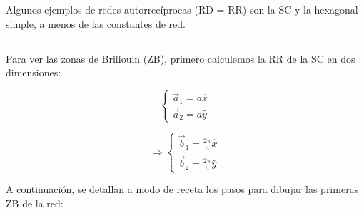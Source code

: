 \documentclass[a4paper]{article}
\begin{document}
Algunos ejemplos de redes autorrec\'iprocas (RD = RR) son la SC y la hexagonal simple, a menos de las constantes de red.

\subsection{}

Para ver las zonas de Brillouin (ZB), primero calculemos la RR de la SC en dos dimensiones:

$$\begin{cases}
\vec{a}_{1} = a\hat{x} \\
\vec{a}_{2} = a\hat{y}
\end{cases}$$

$$\Rightarrow \begin{cases}
\vec{b}_{1} = \frac{2 \pi}{a}\hat{x} \\
\vec{b}_{2} = \frac{2 \pi}{a}\hat{y}
\end{cases}$$

A continuaci\'on, se detallan a modo de receta los pasos para dibujar las primeras ZB de la red:
\end{document}
